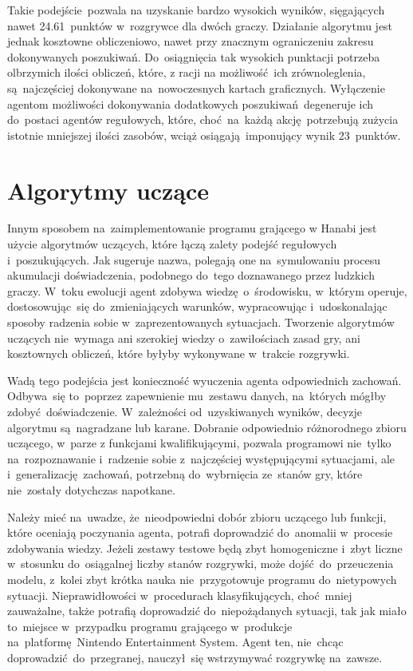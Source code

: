 \documentclass[declaration,shortabstract,inz]{iithesis}
\begin{document}
Takie podejście pozwala na uzyskanie bardzo wysokich wyników, sięgających nawet 24.61~punktów w~rozgrywce dla dwóch graczy. Działanie algorytmu jest jednak kosztowne obliczeniowo, nawet przy znacznym ograniczeniu zakresu dokonywanych poszukiwań. Do~osiągnięcia tak wysokich punktacji potrzeba olbrzymich ilości obliczeń, które, z racji na możliwość ich zrównoleglenia, są~najczęściej dokonywane na~nowoczesnych kartach graficznych. Wyłączenie agentom możliwości dokonywania dodatkowych poszukiwań degeneruje ich do~postaci agentów regułowych, które, choć na~każdą akcję potrzebują zużycia istotnie mniejszej ilości zasobów, wciąż osiągają imponujący wynik 23~punktów.

\section{Algorytmy uczące}

Innym sposobem na~zaimplementowanie programu grającego w Hanabi jest użycie algorytmów uczących, które łączą zalety podejść regułowych i~poszukujących. Jak sugeruje nazwa, polegają one na~symulowaniu procesu akumulacji doświadczenia, podobnego do~tego doznawanego przez ludzkich graczy. W~toku ewolucji agent zdobywa wiedzę o~środowisku, w~którym operuje, dostosowując~się do~zmieniających warunków, wypracowując i~udoskonalając sposoby radzenia sobie w~zaprezentowanych sytuacjach. Tworzenie algorytmów uczących nie~wymaga ani szerokiej wiedzy o~zawiłościach zasad gry, ani kosztownych obliczeń, które byłyby wykonywane w~trakcie rozgrywki.

Wadą tego podejścia jest konieczność wyuczenia agenta odpowiednich zachowań. Odbywa~się to~poprzez zapewnienie mu~zestawu danych, na~których mógłby zdobyć doświadczenie. W~zależności od~uzyskiwanych wyników, decyzje algorytmu są~nagradzane lub karane. Dobranie odpowiednio różnorodnego zbioru uczącego, w~parze z funkcjami kwalifikującymi, pozwala programowi nie~tylko na~rozpoznawanie i~radzenie sobie z~najczęściej występującymi sytuacjami, ale i~generalizację zachowań, potrzebną do~wybrnięcia ze~stanów gry, które nie~zostały dotychczas napotkane.

Należy mieć na~uwadze, że~nieodpowiedni dobór zbioru uczącego lub funkcji, które oceniają poczynania agenta, potrafi doprowadzić do~anomalii w~procesie zdobywania wiedzy. Jeżeli zestawy testowe będą zbyt homogeniczne i~zbyt liczne w~stosunku do~osiągalnej liczby stanów rozgrywki, może dojść do~przeuczenia modelu, z~kolei zbyt krótka nauka nie~przygotowuje programu do~nietypowych sytuacji. Nieprawidłowości w~procedurach klasyfikujących, choć mniej zauważalne, także potrafią doprowadzić do~niepożądanych sytuacji, tak jak miało to~miejsce w~przypadku programu grającego w~produkcje na~platformę Nintendo Entertainment System. Agent ten, nie~chcąc doprowadzić do~przegranej, nauczył~się wstrzymywać rozgrywkę na~zawsze\cite{Mario}.
\end{document}
